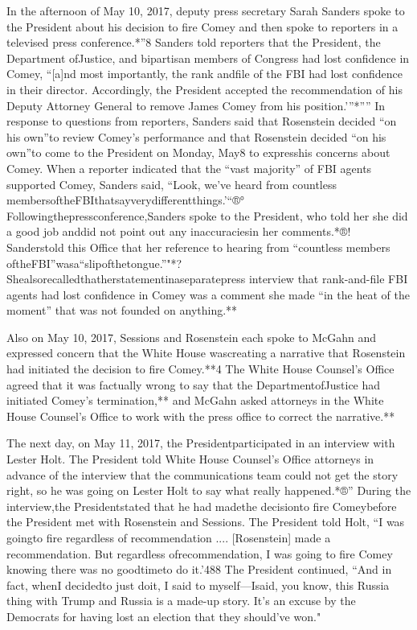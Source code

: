 {In the afternoon of May 10, 2017, deputy press secretary Sarah Sanders spoke to the President about his decision to fire Comey and then spoke to reporters in a televised press conference.*”8 Sanders told reporters that the President, the Department ofJustice, and bipartisan members of Congress had lost confidence in Comey, “[a]nd most importantly, the rank andfile of the FBI had lost confidence in their director. Accordingly, the President accepted the recommendation of his Deputy Attorney General to remove James Comey from his position.’”*”” In response to questions from reporters, Sanders said that Rosenstein decided “on his own”to review Comey’s performance and that Rosenstein decided “on his own”to come to the President on Monday, May8 to expresshis concerns about Comey. When a reporter indicated that the “vast majority” of FBI agents supported Comey, Sanders said, “Look, we’ve heard from countless membersoftheFBIthatsayverydifferentthings.’“®° Followingthepressconference,Sanders spoke to the President, who told her she did a good job anddid not point out any inaccuraciesin her comments.*®! Sanderstold this Office that her reference to hearing from “countless members oftheFBI”wasa“slipofthetongue.”"*? Shealsorecalledthatherstatementinaseparatepress interview that rank-and-file FBI agents had lost confidence in Comey was a comment she made “in the heat of the moment” that was not founded on anything.**

Also on May 10, 2017, Sessions and Rosenstein each spoke to McGahn and expressed concern that the White House wascreating a narrative that Rosenstein had initiated the decision to fire Comey.**4 The White House Counsel’s Office agreed that it was factually wrong to say that the DepartmentofJustice had initiated Comey’s termination,** and McGahn asked attorneys in the White House Counsel’s Office to work with the press office to correct the narrative.**

The next day, on May 11, 2017, the Presidentparticipated in an interview with Lester Holt. The President told White House Counsel’s Office attorneys in advance of the interview that the communications team could not get the story right, so he was going on Lester Holt to say what really happened.*®” During the interview,the Presidentstated that he had madethe decisionto fire Comeybefore the President met with Rosenstein and Sessions. The President told Holt, “I was goingto fire regardless of recommendation .... [Rosenstein] made a recommendation. But regardless ofrecommendation, I was going to fire Comey knowing there was no goodtimeto do it.’488 The President continued, “And in fact, whenI decidedto just doit, I said to myself—Isaid, you know, this Russia thing with Trump and Russia is a made-up story. It’s an excuse by the Democrats for having lost an election that they should’ve won."

}
